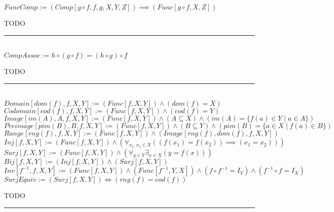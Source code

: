 \documentclass{book}
\newcommand{\abr}{:=}
\newcommand{\pr}[1]{\left(#1\right)}
\newcommand{\st}{\mathbin{|}}
\begin{document}
$FuncComp \abr (Comp[g \circ f, f, g, X, Y, Z]) \implies (Func[g \circ f, X, Z])$
\begin{enumerate}
  \lit TODO
\end{enumerate} \vspace{.75mm} \hrule \vspace{.75mm} \ \\ 

$CompAssoc \abr h \circ (g \circ f) = (h \circ g) \circ f$
\begin{enumerate}
  \lit TODO
\end{enumerate} \vspace{.75mm} \hrule \vspace{.75mm} \ \\ 

$Domain[dom(f), f, X, Y] \abr (Func[f, X, Y]) \land \pr{dom(f) = X}$ \\
$Codomain[cod(f), f, X, Y] \abr (Func[f, X, Y]) \land \pr{cod(f) = Y}$ \\
$Image[im(A), A, f, X, Y] \abr (Func[f, X, Y]) \land (A \subseteq X) \land \pr{im(A) = \{f(a) \in Y \st a \in A\}}$ \\
$Preimage[pim(B), B, f, X, Y] \abr (Func[f, X, Y]) \land (B \subseteq Y) \land \pr{pim(B) = \{a \in X \st f(a) \in B\}}$ \\
$Range[rng(f), f, X, Y] \abr (Func[f, X, Y]) \land \pr{Image[rng(f), dom(f), f, X, Y]}$ \\

$Inj[f, X, Y] \abr (Func[f, X, Y]) \land \pr{\forall_{x_1, x_2 \in X}\pr{\pr{f(x_1) = f(x_2)} \implies (x_1 = x_2)}}$ \\ %
$Surj[f, X, Y] \abr (Func[f, X, Y]) \land \pr{\forall_{y \in Y} \exists_{x \in X}\pr{y = f(x)}}$ \\ %
$Bij[f, X, Y] \abr (Inj[f, X, Y]) \land (Surj[f, X, Y])$ \\ %
$Inv[f^{-1}, f, X, Y] \abr (Func[f, X, Y]) \land (Func[f^{-1}, Y, X]) \land (f \circ f^{-1} = I_Y) \land (f^{-1} \circ f = I_X)$ \\

$SurjEquiv \abr (Surj[f, X, Y]) \iff \pr{rng(f) = cod(f)}$ \\
\begin{enumerate}
  \lit TODO
\end{enumerate} \vspace{.75mm} \hrule \vspace{.75mm} \ \\ 
\end{document}
